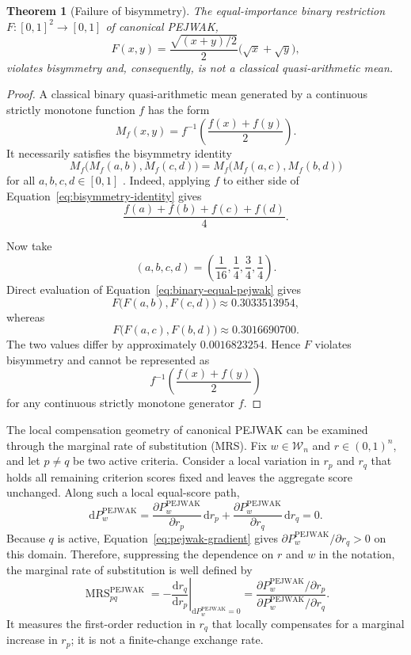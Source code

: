 \documentclass[reqno,11pt]{amsart}
\theoremstyle{definition}
\theoremstyle{plain}
\newtheorem{theorem}{Theorem}
\theoremstyle{remark}
\begin{document}
\begin{theorem}[Failure of bisymmetry]
The equal-importance binary restriction
$F:[0,1]^2\to[0,1]$ of canonical PEJWAK,
\begin{equation}
F(x,y)
=
\frac{\sqrt{(x+y)/2}}{2}
\bigl(\sqrt{x}+\sqrt{y}\bigr),
\label{eq:binary-equal-pejwak}
\end{equation}
violates bisymmetry and, consequently, is not a classical
quasi-arithmetic mean.
\end{theorem}

\begin{proof}
A classical binary quasi-arithmetic mean generated by a continuous
strictly monotone function $f$ has the form
\[
M_f(x,y)
=
f^{-1}
\left(
\frac{f(x)+f(y)}{2}
\right).
\]
It necessarily satisfies the bisymmetry identity
\begin{equation}
M_f\bigl(M_f(a,b),M_f(c,d)\bigr)
=
M_f\bigl(M_f(a,c),M_f(b,d)\bigr)
\label{eq:bisymmetry-identity}
\end{equation}
for all $a,b,c,d\in[0,1]$
\cite{Aczel1948,Beliakov2007}. Indeed, applying $f$ to either side of
Equation~\eqref{eq:bisymmetry-identity} gives
\[
\frac{f(a)+f(b)+f(c)+f(d)}{4}.
\]

Now take
\[
(a,b,c,d)
=
\left(
\frac{1}{16},
\frac{1}{4},
\frac{3}{4},
\frac{1}{4}
\right).
\]
Direct evaluation of Equation~\eqref{eq:binary-equal-pejwak} gives
\[
F\bigl(F(a,b),F(c,d)\bigr)
\approx
0.3033513954,
\]
whereas
\[
F\bigl(F(a,c),F(b,d)\bigr)
\approx
0.3016690700.
\]
The two values differ by approximately $0.0016823254$. Hence $F$
violates bisymmetry and cannot be represented as
\[
f^{-1}
\left(
\frac{f(x)+f(y)}{2}
\right)
\]
for any continuous strictly monotone generator $f$.
\end{proof}

The local compensation geometry of canonical PEJWAK can be examined
through the marginal rate of substitution (MRS). Fix
$w\in\mathcal W_n$ and $r\in(0,1)^n$, and let $p\neq q$ be two active
criteria. Consider a local variation in $r_p$ and $r_q$ that holds all
remaining criterion scores fixed and leaves the aggregate score
unchanged. Along such a local equal-score path,
\[
\mathrm dP_w^{\mathrm{PEJWAK}}
=
\frac{\partial P_w^{\mathrm{PEJWAK}}}{\partial r_p}
\,\mathrm dr_p
+
\frac{\partial P_w^{\mathrm{PEJWAK}}}{\partial r_q}
\,\mathrm dr_q
=
0.
\]
Because $q$ is active, Equation~\eqref{eq:pejwak-gradient} gives
$\partial P_w^{\mathrm{PEJWAK}}/\partial r_q>0$ on this domain.
Therefore, suppressing the dependence on $r$ and $w$ in the notation,
the marginal rate of substitution is well defined by
\begin{equation}
\operatorname{MRS}_{pq}^{\mathrm{PEJWAK}}
=
-
\left.
\frac{\mathrm dr_q}{\mathrm dr_p}
\right|_{\mathrm dP_w^{\mathrm{PEJWAK}}=0}
=
\frac{
\partial P_w^{\mathrm{PEJWAK}}/\partial r_p
}{
\partial P_w^{\mathrm{PEJWAK}}/\partial r_q
}.
\label{eq:mrs-definition}
\end{equation}
It measures the first-order reduction in $r_q$ that locally compensates
for a marginal increase in $r_p$; it is not a finite-change exchange
rate.
\end{document}
